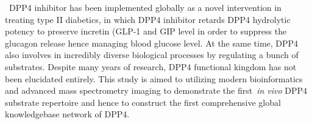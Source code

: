 \ DPP4 inhibitor has been implemented globally as a novel intervention in treating type II diabetics, in which DPP4 inhibitor retards DPP4 hydrolytic potency to preserve incretin (GLP-1 and GIP level in order to suppress the glucagon release hence managing blood glucose level. At the same time, DPP4 also involves in incredibly diverse biological processes by regulating a bunch of substrates. Despite many years of research, DPP4 functional kingdom has not been elucidated entirely. This study is aimed to utilizing modern bioinformatics and advanced mass spectrometry imaging to demonstrate the first~\textit{in vivo}  DPP4 substrate repertoire and hence to construct the first comprehensive global knowledgebase network of DPP4. \\